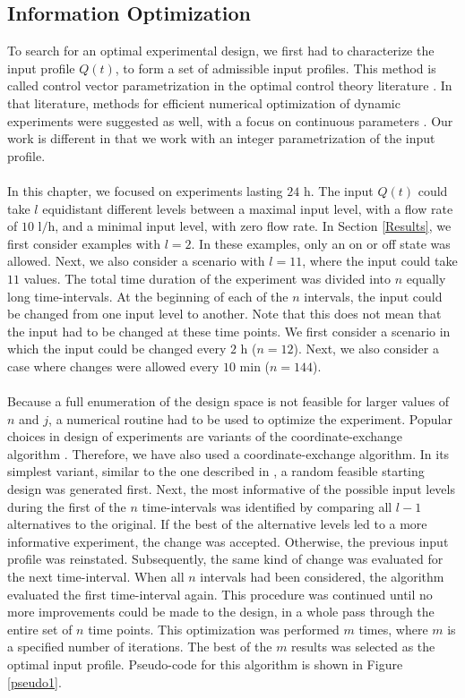 \subsection{Information Optimization}
\label{Optimization}
To search for an optimal experimental design, we first had to characterize the input profile $Q(t)$, to form a set of admissible input profiles. This method is called control vector parametrization in the optimal control theory literature \parencite{vassiliadis}. In that literature, methods for efficient numerical optimization of dynamic experiments were suggested as well, with a focus on continuous parameters \parencite{telen,bauer}. Our work is different in that we work with an integer parametrization of the input profile.
\\
\\
In this chapter, we focused on experiments lasting $24 \text{ h}$. The input $Q(t)$ could take $l$ equidistant different levels between a maximal input level, with a flow rate of $10 \text{ l/h}$, and a minimal input level, with zero flow rate. In Section \ref{Results}, we first consider examples with $l=2$. In these examples, only an on or off state was allowed. Next, we also consider a scenario with $l=11$, where the input could take $11$ values. The total time duration of the experiment was divided into $n$ equally long time-intervals. At the beginning of each of the $n$ intervals, the input could be changed from one input level to another. Note that this does not mean that the input had to be changed at these time points. We first consider a scenario in which the input could be changed every $2 \text{ h}$ ($n=12$). Next, we also consider a case where changes were allowed every $10 \text{ min}$ ($n=144$).
\\
\\
Because a full enumeration of the design space is not feasible for larger values of $n$ and $j$, a numerical routine had to be used to optimize the experiment. Popular choices in design of experiments are variants of the coordinate-exchange algorithm \parencite{meyer}. Therefore, we have also used a coordinate-exchange algorithm. In its simplest variant, similar to the one described in \textcite{goos1}, a random feasible starting design was generated first. Next, the most informative of the possible input levels during the first of the $n$ time-intervals was identified by comparing all $l-1$ alternatives to the original. If the best of the alternative levels led to a more informative experiment, the change was accepted. Otherwise, the previous input profile was reinstated. Subsequently, the same kind of change was evaluated for the next time-interval. When all $n$ intervals had been considered, the algorithm evaluated the first time-interval again. This procedure was continued until no more improvements could be made to the design, in a whole pass through the entire set of $n$ time points. This optimization was performed $m$ times, where $m$ is a specified number of iterations. The best of the $m$ results was selected as the optimal input profile. Pseudo-code for this algorithm is shown in Figure \ref{pseudo1}. 
